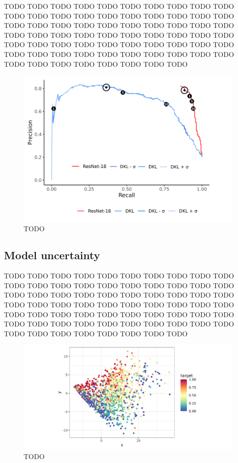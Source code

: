 \documentclass[a4paper, nobind]{templates/cdethesis}
\begin{document}
TODO TODO TODO TODO TODO TODO TODO TODO TODO TODO TODO TODO TODO TODO TODO TODO TODO TODO TODO TODO TODO TODO TODO TODO TODO TODO TODO TODO TODO TODO TODO TODO TODO TODO
TODO TODO TODO TODO TODO TODO TODO TODO TODO TODO TODO TODO TODO TODO TODO TODO TODO TODO TODO TODO TODO TODO TODO TODO TODO TODO TODO TODO TODO TODO TODO TODO TODO TODO

\begin{figure}[!h]
    \centering
    \includegraphics[width=1.1\linewidth]{figures/chapter02/figure06.png}
    \caption{TODO}
    \label{fig:figurexy02}
\end{figure}

\subsection{Model uncertainty}

TODO TODO TODO TODO TODO TODO TODO TODO TODO TODO TODO TODO TODO TODO TODO TODO TODO TODO TODO TODO TODO TODO TODO TODO TODO TODO TODO TODO TODO TODO TODO TODO TODO TODO
TODO TODO TODO TODO TODO TODO TODO TODO TODO TODO TODO TODO TODO TODO TODO TODO TODO TODO TODO TODO TODO TODO TODO TODO TODO TODO TODO TODO TODO TODO TODO TODO TODO TODO

\begin{figure}[!h]
    \centering
    \includegraphics[width=1.1\linewidth]{figures/chapter02/latent_space.png}
    \caption{TODO}
    \label{fig:figurexy03}
\end{figure}
\end{document}
